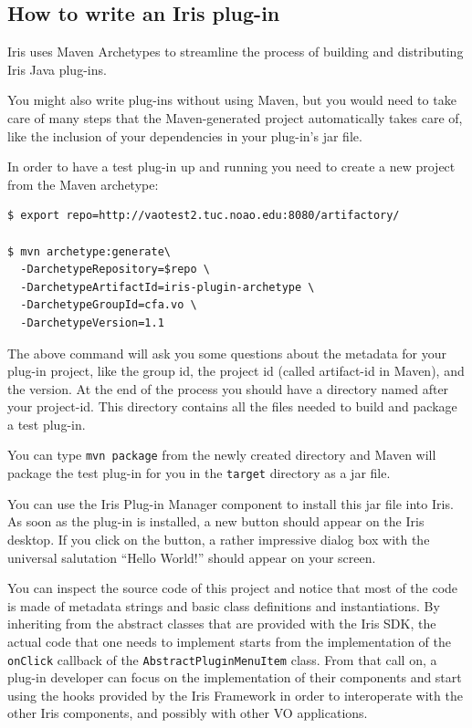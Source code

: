\documentclass[preprint,authoryear,5p]{elsarticle}
\begin{document}
\subsection{How to write an Iris plug-in} \label{sec:writeplugin} Iris uses Maven
Archetypes to streamline the process of building and distributing Iris Java plug-ins.

You might also write plug-ins without using Maven, but you would need to take
care of many steps that the Maven-generated project automatically takes care of,
like the inclusion of your dependencies in your plug-in's jar file.

In order to have a test plug-in up and running you need to create a new project
from the Maven archetype:

\begin{lstlisting}[style=code]
$ export repo=http://vaotest2.tuc.noao.edu:8080/artifactory/

$ mvn archetype:generate\
  -DarchetypeRepository=$repo \
  -DarchetypeArtifactId=iris-plugin-archetype \
  -DarchetypeGroupId=cfa.vo \
  -DarchetypeVersion=1.1
\end{lstlisting}

The above command will ask you some questions about the metadata for your
plug-in project, like the group id, the project id (called artifact-id in
Maven), and the version. At the end of the process you should have a directory
named after your project-id. This directory contains all the files needed to
build and package a test plug-in.

You can type \verb|mvn package| from the newly created directory and Maven will
package the test plug-in for you in the \verb|target| directory as a jar file.

You can use the Iris Plug-in Manager component to install this jar file into
Iris. As soon as the plug-in is installed, a new button should appear on the Iris desktop. If
you click on the button, a rather impressive dialog box with the universal salutation
``Hello World!'' should appear on your screen.

You can inspect the source code of this project and notice that most of the code is
made of metadata strings and basic class definitions and instantiations. By
inheriting from the abstract classes that are provided with the Iris SDK, the
actual code that one needs to implement starts from the implementation of the
\verb|onClick| callback of the \verb|AbstractPluginMenuItem| class. From that call on,
a plug-in developer can focus on the implementation of their components and
start using the hooks provided by the Iris Framework in order to interoperate
with the other Iris components, and possibly with other VO applications.
\end{document}
